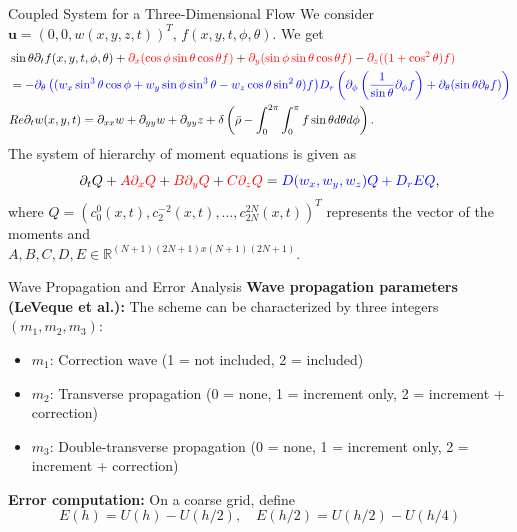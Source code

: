 \begin{frame}{Coupled System for a Three-Dimensional Flow}
	\scriptsize
	We consider $\boldsymbol{u} = \left( 0, 0, w(x,y,z,t)\right)^T$, $f(x,y,t,\phi,\theta)$. We get
	\begin{equation}
		\begin{aligned}
			&\sin\theta \partial_{t}f(x,y,t,\phi, \theta)+ \textcolor{red}{\partial_x(\cos\phi \sin\theta \cos\theta f)} + \textcolor{red}{\partial_y(\sin \phi \sin \theta \cos \theta f)} - \textcolor{red}{\partial_z((1+ \cos^2 \theta)f)} \\
			&= -  \textcolor{blue}{\partial_\theta\left(( w_x \sin^3 \theta \cos \phi + w_y\sin \phi \sin^3 \theta - w_z \cos \theta \sin^2 \theta) f\right)} \textcolor{blue}{D_{r}\left( \partial_\phi \left(\frac{1}{\sin \theta} \partial_\phi f \right)+ \partial_\theta (\sin \theta \partial_\theta f)\right)} \\
			&Re\partial_{t}w(x,y,t) = \partial_{xx}w + \partial_{yy}w + \partial_{yy}z + \delta\left(\bar{\rho}-\int_{0}^{2\pi} \int_{0}^{\pi} f \sin \theta d\theta d\phi \right).
		\end{aligned}
	\end{equation}
	\pause
	The system of hierarchy of moment equations is given as
	\begin{equation}
		\partial_t Q + \textcolor{red}{A  \partial_x Q}
		+ \textcolor{red}{B \partial_y Q} +  \textcolor{red}{C \partial_z Q} =  \textcolor{blue}{ D(w_x,w_y, w_z)Q+ D_rEQ},
	\end{equation}
	where $Q=(c^0_0(x,t), c^{-2}_2(x,t), \ldots, c^{2N}_{2N}(x,t))^T$ represents the vector of the moments and \\
	\vspace{2mm}
	$A,B,C,D,E \in \mathbb{R}^{(N+1)(2N+1)x(N+1)(2N+1)}$.
\end{frame}

\begin{frame}{Wave Propagation and Error Analysis}
	\scriptsize
	\textbf{Wave propagation parameters (LeVeque et al.):}
    The scheme can be characterized by three integers $(m_1, m_2, m_3)$:
	\begin{itemize}
		\item $m_1$: Correction wave (1 = not included, 2 = included)
		\item $m_2$: Transverse propagation (0 = none, 1 = increment only, 2 = increment + correction)
		\item $m_3$: Double-transverse propagation (0 = none, 1 = increment only, 2 = increment + correction)
	\end{itemize}
	
	\medskip
	\textbf{Error computation:}  
	On a coarse grid, define
	\[
	E(h) = U(h) - U(h/2), \quad
	E(h/2) = U(h/2) - U(h/4)
	\]
\end{frame}

